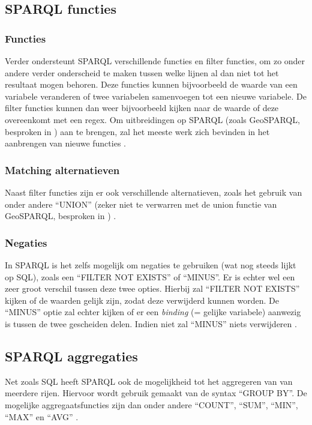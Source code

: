 \subsection{SPARQL functies}
\subsubsection{Functies}
Verder ondersteunt SPARQL verschillende functies en filter functies, om zo onder andere verder onderscheid te maken tussen welke lijnen al dan niet tot het resultaat mogen behoren. Deze functies kunnen bijvoorbeeld de waarde van een variabele veranderen of twee variabelen samenvoegen tot een nieuwe variabele. De filter functies kunnen dan weer bijvoorbeeld kijken naar de waarde of deze overeenkomt met een regex. Om uitbreidingen op SPARQL (zoals GeoSPARQL, besproken in ) aan te brengen, zal het meeste werk zich bevinden in het aanbrengen van nieuwe functies \cite{sparql2013querylanguage}.

\subsubsection{Matching alternatieven}
Naast filter functies zijn er ook verschillende alternatieven, zoals het gebruik van onder andere ``UNION'' (zeker niet te verwarren met de union functie van GeoSPARQL, besproken in ) \cite{sparql2013querylanguage}.

\subsubsection{Negaties}
In SPARQL is het zelfs mogelijk om negaties te gebruiken (wat nog steeds lijkt op SQL), zoals een ``FILTER NOT EXISTS'' of ``MINUS''. Er is echter wel een zeer groot verschil tussen deze twee opties. Hierbij zal ``FILTER NOT EXISTS'' kijken of de waarden gelijk zijn, zodat deze verwijderd kunnen worden. De ``MINUS'' optie zal echter kijken of er een \textit{binding} (= gelijke variabele) aanwezig is tussen de twee gescheiden delen. Indien niet zal ``MINUS'' niets verwijderen \cite{sparql2013querylanguage}.

\subsection{SPARQL aggregaties}
Net zoals SQL heeft SPARQL ook de mogelijkheid tot het aggregeren van van meerdere rijen. Hiervoor wordt gebruik gemaakt van de syntax ``GROUP BY''. De mogelijke aggregaatsfuncties zijn dan onder andere ``COUNT'', ``SUM'', ``MIN'', ``MAX'' en ``AVG'' \cite{sparql2013querylanguage}.

